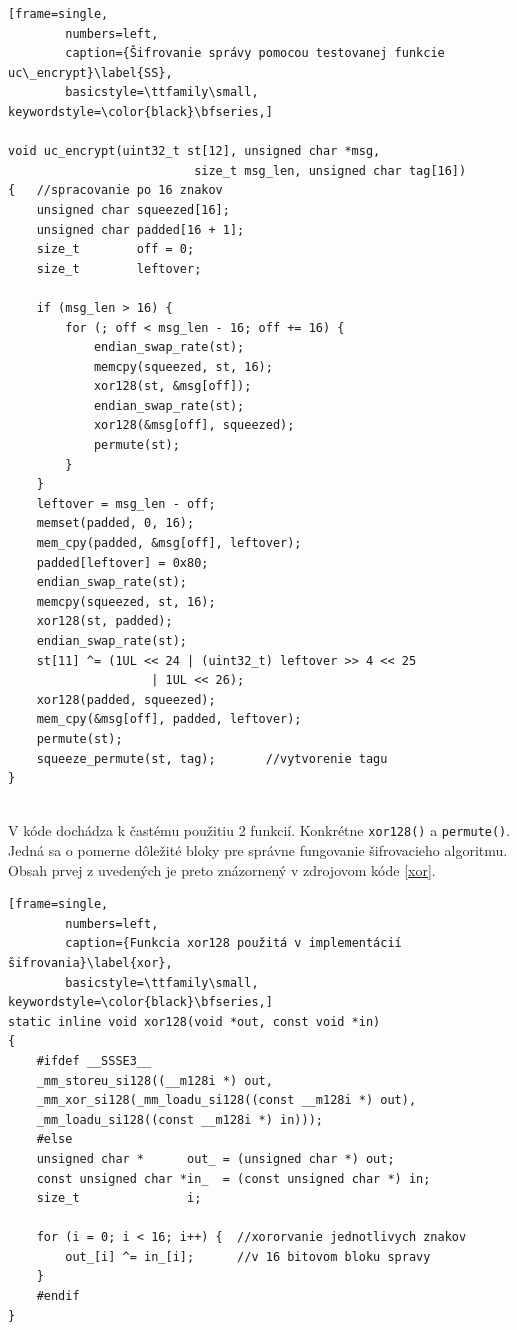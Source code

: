 \begin{minipage}{\linewidth} 	
	\begin{lstlisting}[frame=single,
		numbers=left,
		caption={Šifrovanie správy pomocou testovanej funkcie uc\_encrypt}\label{SS},
		basicstyle=\ttfamily\small, keywordstyle=\color{black}\bfseries,]
 		
void uc_encrypt(uint32_t st[12], unsigned char *msg, 
					      size_t msg_len, unsigned char tag[16])
{	//spracovanie po 16 znakov
	unsigned char squeezed[16];
	unsigned char padded[16 + 1];
	size_t        off = 0;
	size_t        leftover;
	
	if (msg_len > 16) {
		for (; off < msg_len - 16; off += 16) {
			endian_swap_rate(st);
			memcpy(squeezed, st, 16);
			xor128(st, &msg[off]);
			endian_swap_rate(st);
			xor128(&msg[off], squeezed);
			permute(st);
		}
	}
	leftover = msg_len - off;
	memset(padded, 0, 16);
	mem_cpy(padded, &msg[off], leftover);
	padded[leftover] = 0x80;
	endian_swap_rate(st);
	memcpy(squeezed, st, 16);
	xor128(st, padded);
	endian_swap_rate(st);
	st[11] ^= (1UL << 24 | (uint32_t) leftover >> 4 << 25
				    | 1UL << 26); 
	xor128(padded, squeezed);
	mem_cpy(&msg[off], padded, leftover);
	permute(st);
	squeeze_permute(st, tag);		//vytvorenie tagu
}
  	\end{lstlisting}
\end{minipage}\\ 

V kóde dochádza k častému použitiu 2 funkcií. Konkrétne \lstinline|xor128()| a  \lstinline|permute()|. Jedná sa o pomerne dôležité bloky pre správne fungovanie šifrovacieho algoritmu. Obsah prvej z uvedených je preto znázornený v zdrojovom kóde \ref{xor}.

\begin{minipage}{\linewidth} 	
	\begin{lstlisting}[frame=single,
		numbers=left,
		caption={Funkcia xor128 použitá v implementácií šifrovania}\label{xor},
		basicstyle=\ttfamily\small, keywordstyle=\color{black}\bfseries,]
static inline void xor128(void *out, const void *in)
{
	#ifdef __SSSE3__
	_mm_storeu_si128((__m128i *) out,
	_mm_xor_si128(_mm_loadu_si128((const __m128i *) out),
	_mm_loadu_si128((const __m128i *) in)));
	#else
	unsigned char *      out_ = (unsigned char *) out;
	const unsigned char *in_  = (const unsigned char *) in;
	size_t               i;
	
	for (i = 0; i < 16; i++) {	//xororvanie jednotlivych znakov 
		out_[i] ^= in_[i];		//v 16 bitovom bloku spravy
	}
	#endif
}
  	\end{lstlisting}
\end{minipage}\\ 

